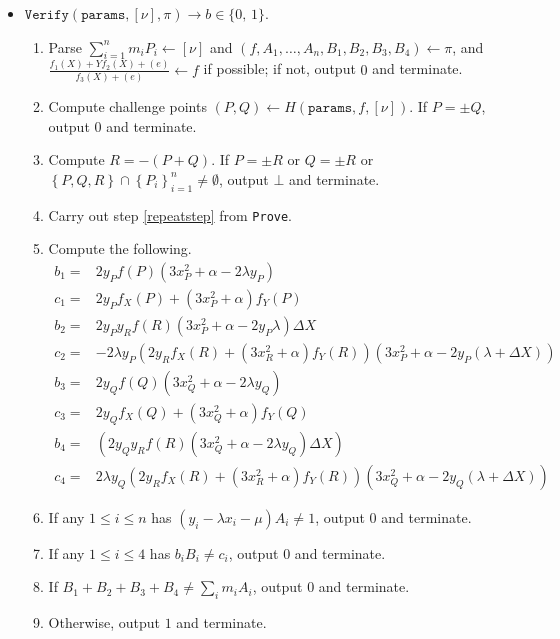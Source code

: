\documentclass[11pt,letterpaper]{article}
\theoremstyle{definition}
\newcommand{\6}{\mathbf}
\newcommand{\7}{\mathcal}
\newcommand{\zo}{\{0, \, 1\}}
\begin{document}
\begin{itemize}
\item $\texttt{Verify}(\texttt{params}, [\nu], \pi) \to b \in \zo$.
\begin{enumerate}
\item Parse $\sum_{i=1}^n m_i P_i \leftarrow [\nu]$ and  $(f,  A_1, \ldots, A_n, B_1, B_2, B_3, B_4) \leftarrow \pi$, and $\frac{f_1(X) + Yf_2(X) + (e)}{f_3(X) + (e)} \leftarrow f$  if possible; if not, output $0$ and terminate.
\item Compute challenge points $(P, Q) \leftarrow H(\texttt{params}, f, [\nu])$. If $P = \pm Q$, output $0$ and terminate.
\item Compute $R = -(P + Q)$. If $P = \pm R$ or $Q = \pm R$ or $\left\{P, Q, R\right\} \cap \left\{P_i\right\}_{i=1}^{n} \neq \emptyset$, output $\bot$ and terminate. %
\item Carry out step \ref{repeatstep} from \texttt{Prove}.
\item Compute the following.
\begin{align}
b_1 =& 2y_Pf(P)(3x_P^2+\alpha-2\lambda y_P) \\
c_1 =& 2y_Pf_X(P) + (3x_P^2+\alpha) f_Y(P)\\
b_2 =& 2y_Py_Rf(R)(3x_P^2+\alpha-2y_P \lambda ) \Delta X\\
c_2 =& - 2\lambda y_P(2y_Rf_X(R) + (3x_R^2+\alpha) f_Y(R))(3x_P^2+\alpha - 2y_P(\lambda + \Delta X))\\
b_3 =& 2y_Qf(Q)(3x_Q^2+\alpha - 2\lambda y_Q)\\
c_3 =& 2y_Qf_X(Q) + (3x_Q^2+\alpha) f_Y(Q) \\
b_4 =& \left(2y_Qy_Rf(R)(3x_Q^2+\alpha  - 2\lambda y_Q) \Delta X\right)\\
c_4 =& 2\lambda y_Q(2y_Rf_X(R) + (3x_R^2+\alpha)f_Y(R))(3x_Q^2+\alpha - 2y_Q(\lambda + \Delta X))
\end{align}

\item If any $1 \leq i \leq n$ has $(y_i - \lambda x_i - \mu)A_i \neq 1$, output $0$ and terminate.

\item If any $1 \leq i \leq 4$ has $b_iB_i \neq c_i$, output $0$ and terminate.

\item If $B_1 + B_2 + B_3 + B_4 \neq \sum_i m_i A_i$, output $0$ and terminate.

\item Otherwise, output $1$ and terminate.

\end{enumerate}

\end{itemize}
\end{document}
